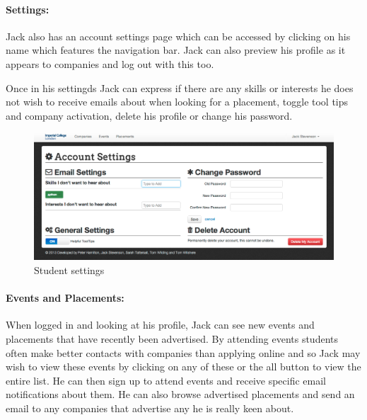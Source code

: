   \paragraph{Settings:}
    Jack also has an account settings page which can be accessed by clicking on his name which features the navigation bar. Jack can also preview his profile as it appears to companies and log out with this too. 

    Once in his settingds Jack can express if there are any skills or interests he does not wish to receive emails about when looking for a placement, toggle tool tips and company activation, delete his profile or change his password.

    \begin{figure}[H]\centering
    \includegraphics[scale=0.3]{images/user_experiences/student/account_settings}
    \caption{Student settings}
    \end{figure}

  \paragraph{Events and Placements:}
    When logged in and looking at his profile, Jack can see new events and placements that have recently been advertised. By attending events students often make better contacts with companies than applying online and so Jack may wish to view these events by clicking on any of these or the all button to view the entire list. He can then sign up to attend events and receive specific email notifications about them.
    He can also browse advertised placements and send an email to any companies that advertise any he is really keen about.


